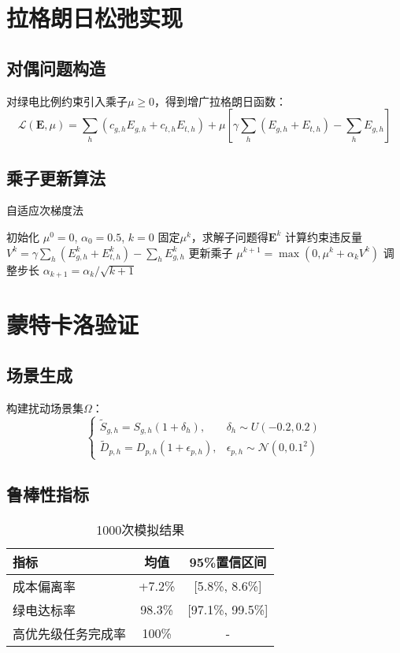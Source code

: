 \documentclass{article}
\begin{document}
\section{拉格朗日松弛实现}
\subsection{对偶问题构造}
对绿电比例约束引入乘子$\mu \geq 0$，得到增广拉格朗日函数：
$$
\mathcal{L}(\mathbf{E},\mu) = \sum_h \left( c_{g,h}E_{g,h} + c_{t,h}E_{t,h} \right) + \mu \left[ \gamma \sum_h (E_{g,h}+E_{t,h}) - \sum_h E_{g,h} \right]
$$

\subsection{乘子更新算法}
\begin{algorithm}[H]
\caption{自适应次梯度法}
\begin{algorithmic}[1]
\STATE 初始化 $\mu^0=0$, $\alpha_0=0.5$, $k=0$
\STATE 固定$\mu^k$，求解子问题得$\mathbf{E}^k$
\STATE 计算约束违反量 $V^k = \gamma \sum_h (E_{g,h}^k+E_{t,h}^k) - \sum_h E_{g,h}^k$
\STATE 更新乘子 $\mu^{k+1} = \max(0, \mu^k + \alpha_k V^k)$
\STATE 调整步长 $\alpha_{k+1} = \alpha_k / \sqrt{k+1}$
\ENDWHILE
\end{algorithmic}
\end{algorithm}

\section{蒙特卡洛验证}
\subsection{场景生成}
构建扰动场景集$\Omega$：
$$
\begin{cases}
\tilde{S}_{g,h} = S_{g,h}(1 + \delta_h), & \delta_h \sim U(-0.2,0.2) \\
\tilde{D}_{p,h} = D_{p,h}(1 + \epsilon_{p,h}), & \epsilon_{p,h} \sim \mathcal{N}(0,0.1^2)
\end{cases}
$$

\subsection{鲁棒性指标}
\begin{table}[h]
\centering
\caption{1000次模拟结果}
\begin{tabular}{lcc}
\toprule
指标 & 均值 & 95\%置信区间 \\
\midrule
成本偏离率 & +7.2\% & [5.8\%, 8.6\%] \\
绿电达标率 & 98.3\% & [97.1\%, 99.5\%] \\
高优先级任务完成率 & 100\% & - \\
\bottomrule
\end{tabular}
\end{table}
\end{document}
